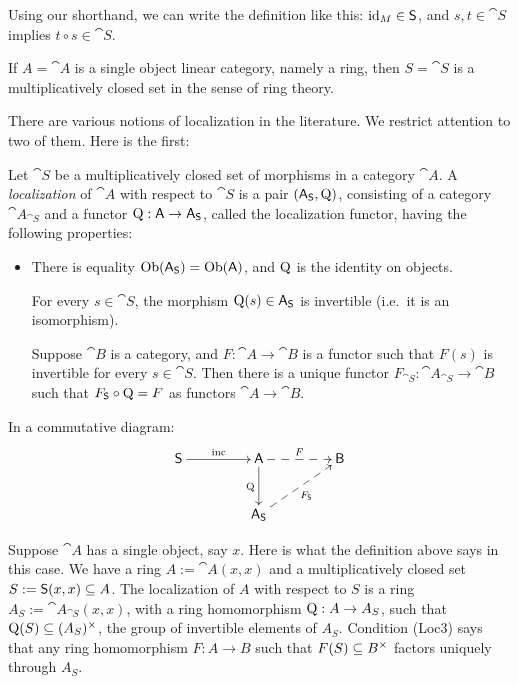 Using our shorthand, we can write the definition like this: 
$\operatorname{id}_M \in \operatorname{\mathsf{S}}$,
and $s, t \in \cat{S}$ implies $t \circ s \in \cat{S}$. 

If $A = \cat{A}$ is a single object linear category, namely a ring, then 
$S = \cat{S}$ is a multiplicatively closed set in the sense of ring theory. 

There are various notions of localization in the literature.  We restrict 
attention to two of them. Here is the first: 

\begin{dfn} \label{dfn:1406}
Let $\cat{S}$ be a multiplicatively closed set of morphisms in a category 
$\cat{A}$. A {\em localization} 
of $\cat{A}$ with respect to $\cat{S}$  
is a pair $(\operatorname{\mathsf{A}}_{\operatorname{\mathsf{S}}}, \operatorname{Q})$, consisting of a category 
$\cat{A}_{\cat{S}}$ and a functor 
$\operatorname{Q} : \operatorname{\mathsf{A}} \to \operatorname{\mathsf{A}}_{\operatorname{\mathsf{S}}}$, called the localization functor,
having the following properties:
\begin{itemize}[leftmargin=32pt] 
\item[(Loc1)] There is equality 
$\operatorname{Ob}(\operatorname{\mathsf{A}}_{\operatorname{\mathsf{S}}}) = \operatorname{Ob}(\operatorname{\mathsf{A}})$, and $\operatorname{Q}$ is the 
identity 
on objects.

For every $s \in \cat{S}$, the morphism $\operatorname{Q}(s) \in \operatorname{\mathsf{A}}_{\operatorname{\mathsf{S}}}$
is invertible (i.e.\ it is an isomorphism). 

 Suppose $\cat{B}$ is a category, and 
$F : \cat{A} \to \cat{B}$
is a functor such that $F(s)$ is invertible for every 
$s \in \cat{S}$. 
Then there is a unique functor 
$F_{\cat{S}} : \cat{A}_{\cat{S}} \to \cat{B}$
such that 
$F_{\operatorname{\mathsf{S}}} \circ \operatorname{Q} = F$ 
as functors $\cat{A} \to \cat{B}$.
\end{itemize}
\end{dfn}

In a commutative diagram:
\[ \UseTips  \xymatrix @C=10ex @R=6ex  {
\cat{S}
\ar[r]^{\mrm{inc}}
&
\cat{A}
\ar@{-->}[r]^{F}="q" 
\ar[d]_{\opn{Q}}
& 
\cat{B}
\\
&
\cat{A}_{\cat{S}}
\ar@{-->}[ur]_{F_{\cat{S}}} ^(0.5){}="f"
} \]

\begin{exa} \label{exa:2310}
Suppose $\cat{A}$ has a single object, say $x$. Here is what the definition 
above says in this case. We have a ring 
$A := \cat{A}(x, x)$ and a multiplicatively closed set
$S := \operatorname{\mathsf{S}}(x, x) \subseteq A$. The localization of $A$ with respect to $S$ is a 
ring $A_S := \cat{A}_{\cat{S}}(x, x)$, with a ring homomorphism 
$\operatorname{Q} : A \to A_S$, such that $\operatorname{Q}(S) \subseteq (A_S)^{\times}$,
the group of invertible elements of $A_S$. 
Condition (Loc3) says that any ring homomorphism
$F : A \to B$ such that $F(S) \subseteq B^{\times}$ factors uniquely through 
$A_S$. 
\end{exa}


